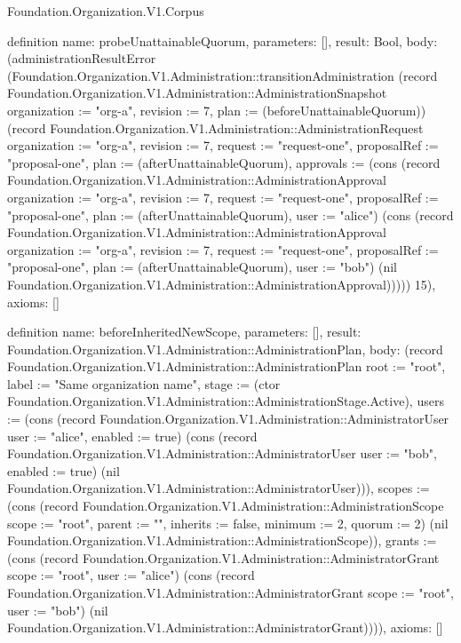 \begin{lexlean}{Foundation.Organization.V1.Corpus}
\begin{semanticmodule}
definition{
  name: probeUnattainableQuorum,
  parameters: [],
  result: Bool,
  body: (administrationResultError (Foundation.Organization.V1.Administration::transitionAdministration (record Foundation.Organization.V1.Administration::AdministrationSnapshot {organization := "org-a", revision := 7, plan := (beforeUnattainableQuorum)}) (record Foundation.Organization.V1.Administration::AdministrationRequest {organization := "org-a", revision := 7, request := "request-one", proposalRef := "proposal-one", plan := (afterUnattainableQuorum), approvals := (cons (record Foundation.Organization.V1.Administration::AdministrationApproval {organization := "org-a", revision := 7, request := "request-one", proposalRef := "proposal-one", plan := (afterUnattainableQuorum), user := "alice"}) (cons (record Foundation.Organization.V1.Administration::AdministrationApproval {organization := "org-a", revision := 7, request := "request-one", proposalRef := "proposal-one", plan := (afterUnattainableQuorum), user := "bob"}) (nil Foundation.Organization.V1.Administration::AdministrationApproval)))})) 15),
  axioms: []
}

definition{
  name: beforeInheritedNewScope,
  parameters: [],
  result: Foundation.Organization.V1.Administration::AdministrationPlan,
  body: (record Foundation.Organization.V1.Administration::AdministrationPlan {root := "root", label := "Same organization name", stage := (ctor Foundation.Organization.V1.Administration::AdministrationStage.Active), users := (cons (record Foundation.Organization.V1.Administration::AdministratorUser {user := "alice", enabled := true}) (cons (record Foundation.Organization.V1.Administration::AdministratorUser {user := "bob", enabled := true}) (nil Foundation.Organization.V1.Administration::AdministratorUser))), scopes := (cons (record Foundation.Organization.V1.Administration::AdministrationScope {scope := "root", parent := "", inherits := false, minimum := 2, quorum := 2}) (nil Foundation.Organization.V1.Administration::AdministrationScope)), grants := (cons (record Foundation.Organization.V1.Administration::AdministratorGrant {scope := "root", user := "alice"}) (cons (record Foundation.Organization.V1.Administration::AdministratorGrant {scope := "root", user := "bob"}) (nil Foundation.Organization.V1.Administration::AdministratorGrant)))}),
  axioms: []
}


\end{semanticmodule}
\end{lexlean}
